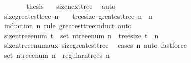 \begin{isabellebody}
\ \ \ \ \isamarkupfalse%
\ \isamarkupfalse%
\ {\isacharquery}{\kern0pt}thesis\ \isamarkupfalse%
\ {}\ size{\isacharunderscore}{\kern0pt}next{\isacharunderscore}{\kern0pt}tree{\isacharprime}{\kern0pt}\ \isamarkupfalse%
\ auto\isanewline
\ \ \isamarkupfalse%
\isanewline
{}\isamarkupfalse%
%
\endisatagproof
{\isafoldproof}%
%
\isadelimproof
\isanewline
%
\endisadelimproof
\isanewline
{}\isamarkupfalse%
\ size{\isacharunderscore}{\kern0pt}greatest{\isacharunderscore}{\kern0pt}tree{\isacharcolon}{\kern0pt}\ {\isachardoublequoteopen}n\ {\isasymnoteq}\ {}\ {\isasymLongrightarrow}\ tree{\isacharunderscore}{\kern0pt}size\ {\isacharparenleft}{\kern0pt}greatest{\isacharunderscore}{\kern0pt}tree\ n{\isacharparenright}{\kern0pt}\ {\isacharequal}{\kern0pt}\ n{\isachardoublequoteclose}\isanewline
%
\isadelimproof
\ \ %
\endisadelimproof
%
\isatagproof
{}\isamarkupfalse%
\ {\isacharparenleft}{\kern0pt}induction\ n\ rule{\isacharcolon}{\kern0pt}\ greatest{\isacharunderscore}{\kern0pt}tree{\isachardot}{\kern0pt}induct{\isacharparenright}{\kern0pt}\ auto%
\endisatagproof
{\isafoldproof}%
%
\isadelimproof
\isanewline
%
\endisadelimproof
\isanewline
{}\isamarkupfalse%
\ size{\isacharunderscore}{\kern0pt}n{\isacharunderscore}{\kern0pt}tree{\isacharunderscore}{\kern0pt}enum{\isacharcolon}{\kern0pt}\ {\isachardoublequoteopen}t\ {\isasymin}\ set\ {\isacharparenleft}{\kern0pt}n{\isacharunderscore}{\kern0pt}tree{\isacharunderscore}{\kern0pt}enum\ n{\isacharparenright}{\kern0pt}\ {\isasymLongrightarrow}\ tree{\isacharunderscore}{\kern0pt}size\ t\ {\isacharequal}{\kern0pt}\ n{\isachardoublequoteclose}\isanewline
%
\isadelimproof
\ \ %
\endisadelimproof
%
\isatagproof
{}\isamarkupfalse%
\ size{\isacharunderscore}{\kern0pt}n{\isacharunderscore}{\kern0pt}tree{\isacharunderscore}{\kern0pt}enum{\isacharunderscore}{\kern0pt}aux\ size{\isacharunderscore}{\kern0pt}greatest{\isacharunderscore}{\kern0pt}tree\ \isamarkupfalse%
\ {\isacharparenleft}{\kern0pt}cases\ n{\isacharcomma}{\kern0pt}\ auto{\isacharcomma}{\kern0pt}\ fastforce{\isacharparenright}{\kern0pt}%
\endisatagproof
{\isafoldproof}%
%
\isadelimproof
%
\endisadelimproof
%
\isadelimdocument
%
\endisadelimdocument
%
\isatagdocument
%
\isamarkuptrue%
%
\endisatagdocument
{\isafolddocument}%
%
\isadelimdocument
%
\endisadelimdocument
{}\isamarkupfalse%
\ {\isachardoublequoteopen}set\ {\isacharparenleft}{\kern0pt}n{\isacharunderscore}{\kern0pt}tree{\isacharunderscore}{\kern0pt}enum\ n{\isacharparenright}{\kern0pt}\ {\isasymsubseteq}\ regular{\isacharunderscore}{\kern0pt}n{\isacharunderscore}{\kern0pt}trees\ n{\isachardoublequoteclose}\isanewline

\end{isabellebody}
